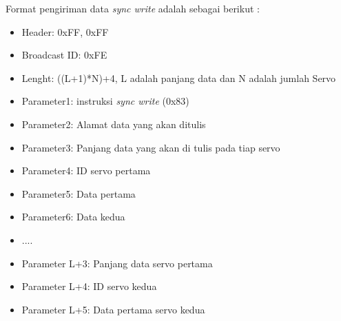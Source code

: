 Format pengiriman data \emph{sync write} adalah sebagai berikut :
\begin{itemize}
  \item Header: 0xFF, 0xFF
  \item Broadcast ID: 0xFE
  \item Lenght: ((L+1)*N)+4, L adalah panjang data dan N adalah jumlah Servo
  \item Parameter1: instruksi \emph{sync write} (0x83)
  \item Parameter2: Alamat data yang akan ditulis
  \item Parameter3: Panjang data yang akan di tulis pada tiap servo
  \item Parameter4: ID servo pertama
  \item Parameter5: Data pertama
  \item Parameter6: Data kedua 
  \item ....
  \item Parameter L+3: Panjang data servo pertama
  \item Parameter L+4: ID servo kedua
  \item Parameter L+5: Data pertama servo kedua
\end{itemize}


